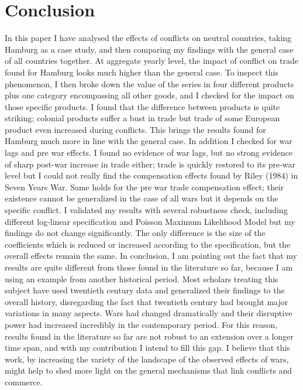 \documentclass[12pt,a4paper,titlepage]{article}
\begin{document}
\section{Conclusion}
In this paper I have analysed the effects of conflicts on neutral countries, taking Hamburg as a case study, and then comparing my findings with the general case of all countries together. At aggregate yearly level, the impact of conflict on trade found for Hamburg looks much higher than the general case. To inspect this phenomenon, I then broke down the value of the series in four different products plus one category encompassing all other goods, and I checked for the impact on those specific products. I found that the difference between products is quite striking; colonial products suffer a bust in trade but trade of some European product even increased during conflicts. This brings the results found for Hamburg much more in line with the general case. In addition I checked for war lags and pre war effects. I found no evidence of war lags, but no strong evidence of sharp post-war increase in trade either; trade is quickly restored to its pre-war level but I could not really find the compensation effects found by Riley (1984) in Seven Years War. Same holds for the pre war trade compensation effect; their existence cannot be generalized in the case of all wars but it depends on the specific conflict. I validated my results with several robustness check, including different log-linear specification and Poisson Maximum Likelihood Model but my findings do not change significantly. The only difference is the size of the coefficients which is reduced or increased according to the specification, but the overall effects remain the same. 
In conclusion, I am pointing out the fact that my results are quite different from those found in the literature so far, because I am using an example from another historical period. Most scholars treating this subject have used twentieth century data and generalized their findings to the overall history, disregarding the fact that twentieth century had brought major variations in many aspects. Wars had changed dramatically and their disruptive power had increased incredibly in the contemporary period. For this reason, results found in the literature so far are not robust to an extension over a longer time span, and with my contribution I intend to fill this gap. I believe that this work, by increasing the variety of the landscape of the observed effects of wars, might help to shed more light on the general mechanisms that link conflicts and commerce.
\end{document}
